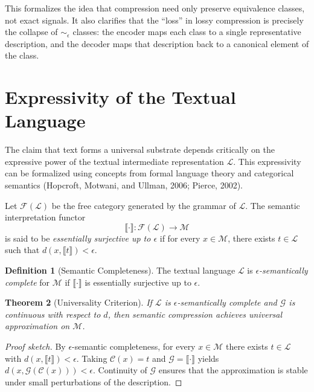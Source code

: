 \documentclass[11pt,a4paper]{article}
\newtheorem{theorem}{Theorem}[section]
\theoremstyle{definition}
\newtheorem{definition}[theorem]{Definition}
\theoremstyle{remark}
\begin{document}
This formalizes the idea that compression need only preserve equivalence classes, not exact signals. It also clarifies that the ``loss'' in lossy compression is precisely the collapse of $\sim_\epsilon$ classes: the encoder maps each class to a single representative description, and the decoder maps that description back to a canonical element of the class.

\section{Expressivity of the Textual Language}
\label{sec:expressivity}

The claim that text forms a universal substrate depends critically on the expressive power of the textual intermediate representation $\mathcal{L}$. This expressivity can be formalized using concepts from formal language theory and categorical semantics (Hopcroft, Motwani, and Ullman, 2006; Pierce, 2002).

Let $\mathcal{F}(\mathcal{L})$ be the free category generated by the grammar of $\mathcal{L}$. The semantic interpretation functor
\[
\llbracket \cdot \rrbracket : \mathcal{F}(\mathcal{L}) \to \mathcal{M}
\]
is said to be \emph{essentially surjective up to $\epsilon$} if for every $x \in \mathcal{M}$, there exists $t \in \mathcal{L}$ such that $d(x, \llbracket t \rrbracket) < \epsilon$.

\begin{definition}[Semantic Completeness]
The textual language $\mathcal{L}$ is \emph{$\epsilon$-semantically complete} for $\mathcal{M}$ if $\llbracket \cdot \rrbracket$ is essentially surjective up to $\epsilon$.
\end{definition}

\begin{theorem}[Universality Criterion]
If $\mathcal{L}$ is $\epsilon$-semantically complete and $\mathcal{G}$ is continuous with respect to $d$, then semantic compression achieves universal approximation on $\mathcal{M}$.
\end{theorem}

\begin{proof}[Proof sketch]
By $\epsilon$-semantic completeness, for every $x \in \mathcal{M}$ there exists $t \in \mathcal{L}$ with $d(x, \llbracket t \rrbracket) < \epsilon$. Taking $\mathcal{C}(x) = t$ and $\mathcal{G} = \llbracket \cdot \rrbracket$ yields $d(x, \mathcal{G}(\mathcal{C}(x))) < \epsilon$. Continuity of $\mathcal{G}$ ensures that the approximation is stable under small perturbations of the description.
\end{proof}
\end{document}

